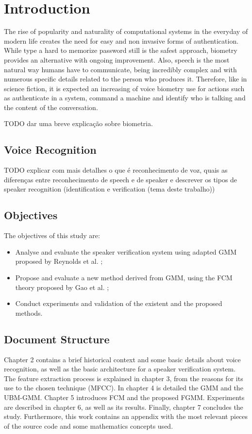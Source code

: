 \chapter{Introduction}

The rise of popularity and naturality of computational systems in the everyday of modern life creates the need for easy and non invasive forms of authentication. While type a hard to memorize password still is the safest approach, biometry provides an alternative with ongoing improvement. Also, speech is the most natural way humans have to communicate, being incredibly complex and with numerous specific details related to the person who produces it. Therefore, like in science fiction, it is expected an increasing of voice biometry use for actions such as authenticate in a system, command a machine and identify who is talking and the content of the conversation.

TODO dar uma breve explicação sobre biometria.

\section{Voice Recognition}

TODO explicar com mais detalhes o que é reconhecimento de voz, quais as diferenças entre reconhecimento de speech e de speaker e descrever os tipos de speaker recognition (identification e verification (tema deste trabalho))

\section{Objectives}

The objectives of this study are:

\begin{itemize}\itemsep0pt
    \item Analyse and evaluate the speaker verification system using adapted GMM proposed by Reynolds et al. \autocite{reynolds.quatieri.dunn.2000};
    \item Propose and evaluate a new method derived from GMM, using the FCM theory proposed by Gao et al. \autocite{gao.zhou.pu.2013};
    \item Conduct experiments and validation of the existent and the proposed methods.
\end{itemize}

\section{Document Structure}

Chapter 2 contains a brief historical context and some basic details about voice recognition, as well as the basic architecture for a speaker verification system. The feature extraction process is explained in chapter 3, from the reasons for its use to the chosen technique (MFCC). In chapter 4 is detailed the GMM and the UBM-GMM. Chapter 5 introduces FCM and the proposed FGMM. Experiments are described in chapter 6, as well as its results. Finally, chapter 7 concludes the study. Furthermore, this work contains an appendix with the most relevant pieces of the source code and some mathematics concepts used.